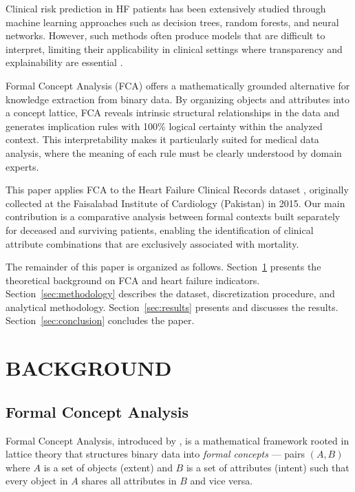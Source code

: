 \documentclass[a4paper,twoside]{article}
\begin{document}
Clinical risk prediction in HF patients has been extensively studied through machine learning approaches such as decision trees, random forests, and neural networks. However, such methods often produce models that are difficult to interpret, limiting their applicability in clinical settings where transparency and explainability are essential \cite{Ahmad2017}.

Formal Concept Analysis (FCA) \cite{Ganter1999} offers a mathematically grounded alternative for knowledge extraction from binary data. By organizing objects and attributes into a concept lattice, FCA reveals intrinsic structural relationships in the data and generates implication rules with 100\% logical certainty within the analyzed context. This interpretability makes it particularly suited for medical data analysis, where the meaning of each rule must be clearly understood by domain experts.

This paper applies FCA to the Heart Failure Clinical Records dataset \cite{Chicco2020}, originally collected at the Faisalabad Institute of Cardiology (Pakistan) in 2015. Our main contribution is a comparative analysis between formal contexts built separately for deceased and surviving patients, enabling the identification of clinical attribute combinations that are exclusively associated with mortality.

The remainder of this paper is organized as follows. Section~\ref{sec:background} presents the theoretical background on FCA and heart failure indicators. Section~\ref{sec:methodology} describes the dataset, discretization procedure, and analytical methodology. Section~\ref{sec:results} presents and discusses the results. Section~\ref{sec:conclusion} concludes the paper.

\section{\uppercase{Background}}
\label{sec:background}

\subsection{Formal Concept Analysis}

Formal Concept Analysis, introduced by \cite{Ganter1999}, is a mathematical framework rooted in lattice theory that structures binary data into \textit{formal concepts} — pairs $(A, B)$ where $A$ is a set of objects (extent) and $B$ is a set of attributes (intent) such that every object in $A$ shares all attributes in $B$ and vice versa.
\end{document}
